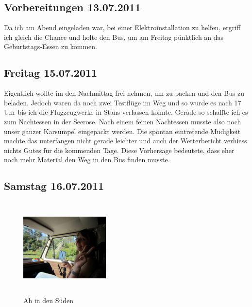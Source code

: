 \subsection{Vorbereitungen 13.07.2011}
Da ich am Abend eingeladen war,  bei einer Elektroinstallation zu helfen, ergriff ich gleich die Chance und holte den Bus, um am Freitag pünktlich an das Geburtstags-Essen zu kommen.

\subsection{Freitag 15.07.2011}
Eigentlich wollte im den Nachmittag frei nehmen, um zu packen und den Bus zu beladen.
Jedoch waren da noch zwei Testflüge im Weg und so wurde es nach 17 Uhr bis ich die Flugzeugwerke in Stans verlassen konnte.
Gerade so schaffte ich es zum Nachtessen in der Seerose.
Nach einem feinen Nachtessen musste also noch unser ganzer Karsumpel eingepackt werden.
Die spontan eintretende Müdigkeit machte das unterfangen nicht gerade leichter und auch der Wetterbericht verhiess nichts Gutes für die kommenden
Tage.
Diese Vorhersage bedeutete, dass eher noch mehr Material den Weg in den Bus finden musste.

\subsection{Samstag 16.07.2011}
\begin{figure} 
  \begin{centering}
    \includegraphics[width=0.4\textwidth, height=5cm, keepaspectratio]{../Bilder/Locarno/3.jpg}
    \caption{Ab in den Süden}
  \end{centering}
\end{figure} 

